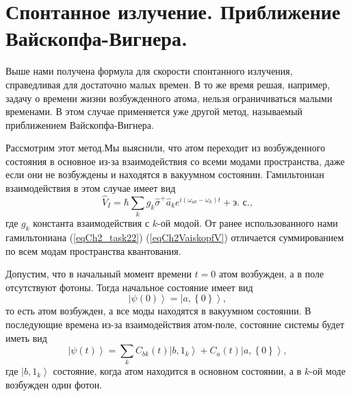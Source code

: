 \section{Спонтанное излучение. Приближение Вайскопфа-Вигнера.}
Выше нами получена формула для скорости спонтанного излучения,
справедливая для достаточно малых времен. В то же время решая,
например, задачу о времени жизни возбужденного атома, нельзя
ограничиваться малыми временами. В этом случае применяется уже другой
метод, называемый приближением Вайскопфа-Вигнера.

Рассмотрим этот метод.Мы выяснили, что атом переходит из возбужденного
состояния в основное из-за взаимодействия со всеми модами
пространства, даже если они не возбуждены и находятся в вакуумном
состоянии. Гамильтониан взаимодействия в этом случае имеет вид
\begin{equation}
\hat{V}_I = \hbar \sum_{k} g_k \hat{\sigma}^{+}\hat{a}_k e^{i\left(
\omega_{ab} - \omega_k
\right)t} + \mbox{э. с.},
\label{eqCh2VaiskopfV}
\end{equation}
где $g_k$ константа взаимодействия с $k$-ой модой. От ранее
использованного нами гамильтониана (\ref{eqCh2_task22})
(\ref{eqCh2VaiskopfV}) отличается суммированием по всем модам
пространства квантования. 

Допустим, что в начальный момент времени $t=0$ атом возбужден, а в
поле отсутствуют фотоны. Тогда начальное состояние имеет вид
\begin{equation}
\left|\psi\left(0\right)\right> =
 \left|a, \left\{0\right\}\right>,
\nonumber
\end{equation}
то есть атом возбужден, а все моды находятся в вакуумном состоянии. В
последующие времена из-за взаимодействия атом-поле, состояние системы
будет иметь вид
\begin{equation}
\left|\psi\left(t\right)\right> =
\sum_{k} C_{bk}\left(t\right) \left|b, 1_k\right>
+
C_{a}\left(t\right) \left|a, \left\{0\right\}\right>,
\label{eqCh2Vaiskopf3}
\end{equation}
где $\left|b, 1_k\right>$ состояние, когда атом находится в основном
состоянии, а в $k$-ой моде возбужден один фотон.

